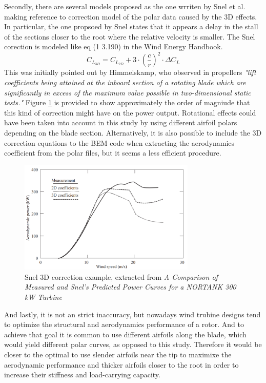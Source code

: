 Secondly, there are several models proposed as the one wrriten by Snel et al. making reference to correction model of the polar data caused by the 3D effects. In particular, the one propsoed by Snel states that it appears a delay in the stall of the sections closer to the root where the relative velocity is smaller. The Snel corection is modeled like eq (1
3.190) in the Wind Energy Handbook. 
\begin{equation}
C_{L_{3D}} = C_{L_{2D}} + 3 \cdot (\frac{c}{r})^2 \cdot \Delta C_L
\end{equation}
This was initially pointed out by Himmelskamp, who observed in propellers \cite{weh-ch3} \textit{"lift coefficients being attained at the inboard section of a rotating blade which are significantly in excess of the maximum value possible in two-dimensional static tests."} Figure \ref{snel} is provided to show approximately the order of magniude that this kind of correction might have on the power output. Rotational effects could have been taken into account in this study by using different airfoil polars depending on the blade section. Alternatively, it is also possible to include the 3D correction equations to the BEM code when extracting the aerodynamics coefficient from the polar files, but it seems a less efficient procedure.\\

\begin{figure}[htbp]
\includegraphics[width=0.75\textwidth]{./img/snel_fig.png}
\caption{ Snel 3D correction example, extracted from \cite{weh-ch3} \textit{A Comparison of Measured and Snel’s Predicted Power Curves for a NORTANK 300 kW Turbine}}
\centering
\label{snel}
\end{figure}

And lastly, it is not an strict inaccuracy, but nowadays wind trubine designs tend to optimize the structural and aerodynamics performance of a rotor. And to achieve that goal it is common to use different airfoils along the blade, which would yield different polar curves, as opposed to this study. Therefore it would be closer to the optimal to use slender airfoils near the tip to maximixe the aerodynamic performance and thicker airfoils closer to the root in order to increase their stiffness and load-carrying capacity. 